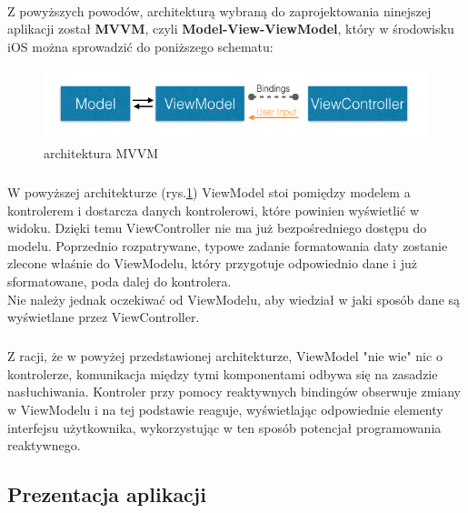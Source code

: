 \documentclass[12pt,oneside,a4paper]{report}
\begin{document}
\paragraph{}Z powyższych powodów, architekturą wybraną do zaprojektowania ninejszej aplikacji został \textbf{MVVM}, czyli \textbf{Model-View-ViewModel}, który w środowisku iOS można sprowadzić do poniższego schematu:
  	\begin{figure}[ht!]
  	\centering
  	\includegraphics[width=13cm]{rxMVVM}
  	\caption{architektura MVVM\cite{rxMVVM}}
  	\label{rxMVVM}
  \end{figure}
\subparagraph{}W powyższej architekturze (rys.\ref{rxMVVM}) ViewModel stoi pomiędzy modelem a kontrolerem i dostarcza danych kontrolerowi, które powinien wyświetlić w widoku. Dzięki temu ViewController nie ma już bezpośredniego dostępu do modelu. Poprzednio rozpatrywane, typowe zadanie formatowania daty zostanie zlecone właśnie do ViewModelu, który przygotuje odpowiednio dane i już sformatowane, poda dalej do kontrolera.
\\Nie należy jednak oczekiwać od ViewModelu, aby wiedział w jaki sposób dane są wyświetlane przez ViewController. 
\subparagraph{}Z racji, że w powyżej przedstawionej architekturze, ViewModel "nie wie" nic o kontrolerze, komunikacja między tymi komponentami odbywa się na zasadzie nasłuchiwania. Kontroler przy pomocy reaktywnych bindingów obserwuje zmiany w ViewModelu i na tej podstawie reaguje, wyświetlając odpowiednie elementy interfejsu użytkownika, wykorzystując w ten sposób potencjał programowania reaktywnego. 
\pagebreak
\subsection{Prezentacja aplikacji}
\end{document}
